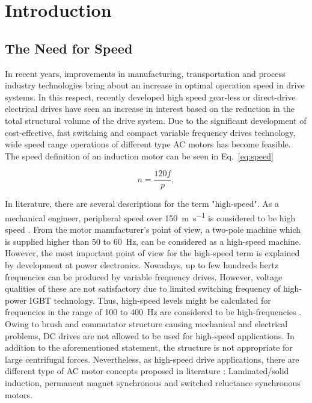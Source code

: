 \chapter{Introduction}

\section{The Need for Speed}

In recent years, improvements in manufacturing, transportation and process industry
technologies bring about an increase in optimal operation speed in drive systems. In this
respect, recently developed high speed gear-less or direct-drive electrical drives have seen an
increase in interest based on the reduction in the total structural volume of the drive
system. Due to the significant development of cost-effective, fast switching and compact
variable frequency drives technology, wide speed range operations of different type AC motors
has become feasible. The speed definition of an induction motor can be seen in Eq.\ \ref{eq:speed}

\begin{equation}  \label{eq:speed}
  n = \frac{120 f}{p},
\end{equation}

In literature, there are several descriptions for the term "high-speed".  As a mechanical
engineer, peripheral speed over \SI{150}{\meter\per\second} is considered to be high speed
\cite{gieras2011performance}. From the motor manufacturer's point of view, a two-pole machine
which is supplied higher than 50 to \SI{60}{\hertz}, can be considered as a high-speed machine.
However, the most important point of view for the high-speed term is explained by development
at power electronics. Nowadays, up to few hundreds hertz frequencies can be produced by
variable frequency drives. However, voltage qualities of these are not satisfactory due to
limited switching frequency of high-power IGBT technology. Thus, high-speed levels might be
calculated for frequencies in the range of 100 to \SI{400}{\hertz} are considered to be
high-frequencies \cite{pyrhonen1991high}.  Owing to brush and commutator structure causing mechanical and
electrical problems, DC drives are not allowed to be used for high-speed applications. In
addition to the aforementioned statement, the structure is not appropriate for large
centrifugal forces.  Nevertheless, as high-speed drive applications, there are different type
of AC motor concepts proposed in literature
\cite{gieras2011performance, pyrhonen1991high, lahteenmaki2002design, saari1998thermal}:
Laminated/solid induction, permanent
magnet synchronous and switched reluctance synchronous motors.

